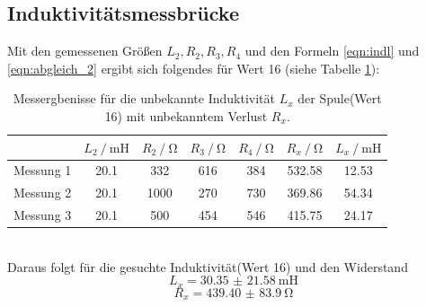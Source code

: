 \subsection{Induktivitätsmessbrücke}
Mit den gemessenen Größen $L_2, R_2, R_3, R_4$ und den Formeln \eqref{eqn:indl} und \eqref{eqn:abgleich_2} ergibt sich folgendes für Wert 16 (siehe Tabelle \ref{tab:d_19}):
\begin{table}
  \centering
  \begin{tabular}{c|cccccc}
    \toprule
    & {$L_2 \:/\: \si{\milli\henry}$} & {$R_2\:/\: \si{\ohm}$} & {$R_3\:/\: \si{\ohm}$} & {$R_4\:/\: \si{\ohm}$} & {$R_x\:/\: \si{\ohm}$} & {$L_x \:/\: \si{\milli \henry}$} \\
    \midrule
    {Messung 1} & 20.1 & 332 & 616 & 384 & 532.58 & 12.53\\
    {Messung 2} & 20.1 & 1000 & 270 & 730 & 369.86 & 54.34\\
    {Messung 3} & 20.1 & 500 & 454 & 546 & 415.75 & 24.17\\
    \bottomrule
  \end{tabular}
  \caption{Messergbenisse für die unbekannte Induktivität $L_x$ der Spule(Wert 16) mit unbekanntem Verlust $R_x$.}
  \label{tab:d_19}
\end{table}
\\
Daraus folgt für die gesuchte Induktivität(Wert 16) und den Widerstand
\begin{equation*}
  L_x = \SI{30.35(2158)}{\milli\henry}
\end{equation*}
\begin{equation*}
  R_x = \SI{439.40(8390)}{\ohm}
\end{equation*}
